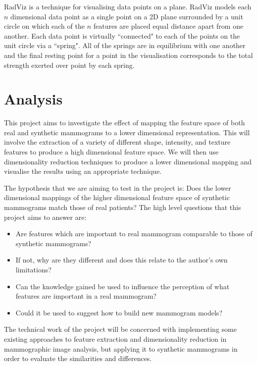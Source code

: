 RadViz \cite{novakova2009radviz} is a technique for visualising data points on a plane. RadViz models each $n$ dimensional data point as a single point on a 2D plane surrounded by a unit circle on which each of the $n$ features are placed equal distance apart from one another. Each data point is virtually ``connected" to each of the points on the unit circle via a ``spring". All of the springs are in equilibrium with one another and the final resting point for a point in the visualisation corresponds to the total strength exerted over point by each spring.

\section{Analysis}
This project aims to investigate the effect of mapping the feature space of both real and synthetic mammograms to a lower dimensional representation. This will involve the extraction of a variety of different shape, intensity, and texture features to produce a high dimensional feature space. We will then use dimensionality reduction techniques to produce a lower dimensional mapping and visualise the results using an appropriate technique. 

The hypothesis that we are aiming to test in the project is: Does the lower dimensional mappings of the higher dimensional feature space of synthetic mammograms match those of real patients? The high level questions that this project aims to answer are:

\begin{itemize}
	\item Are features which are important to real mammogram comparable to those of synthetic mammograms?
	\item If not, why are they different and does this relate to the author's own limitations?
	\item Can the knowledge gained be used to influence the perception of what features are important in a real mammogram?
	\item Could it be used to suggest how to build new mammogram models?
\end{itemize}

The technical work of the project will be concerned with implementing some existing approaches to feature extraction and dimensionality reduction in mammographic image analysis, but applying it to synthetic mammograms in order to evaluate the similarities and differences.

